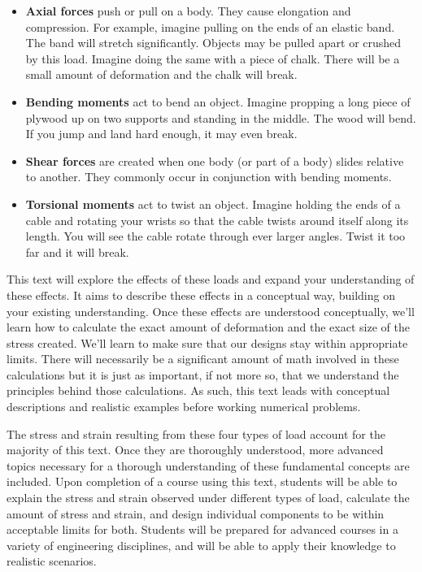 \documentclass[
  letterpaper,
  DIV=11,
  numbers=noendperiod]{scrreprt}
\begin{document}
\begin{itemize}
\item
  \textbf{Axial forces} push or pull on a body. They cause elongation
  and compression. For example, imagine pulling on the ends of an
  elastic band. The band will stretch significantly. Objects may be
  pulled apart or crushed by this load. Imagine doing the same with a
  piece of chalk. There will be a small amount of deformation and the
  chalk will break.
\item
  \textbf{Bending moments} act to bend an object. Imagine propping a
  long piece of plywood up on two supports and standing in the middle.
  The wood will bend. If you jump and land hard enough, it may even
  break.
\item
  \textbf{Shear forces} are created when one body (or part of a body)
  slides relative to another. They commonly occur in conjunction with
  bending moments.
\item
  \textbf{Torsional moments} act to twist an object. Imagine holding the
  ends of a cable and rotating your wrists so that the cable twists
  around itself along its length. You will see the cable rotate through
  ever larger angles. Twist it too far and it will break.
\end{itemize}

This text will explore the effects of these loads and expand your
understanding of these effects. It aims to describe these effects in a
conceptual way, building on your existing understanding. Once these
effects are understood conceptually, we'll learn how to calculate the
exact amount of deformation and the exact size of the stress created.
We'll learn to make sure that our designs stay within appropriate
limits. There will necessarily be a significant amount of math involved
in these calculations but it is just as important, if not more so, that
we understand the principles behind those calculations. As such, this
text leads with conceptual descriptions and realistic examples before
working numerical problems.

The stress and strain resulting from these four types of load account
for the majority of this text. Once they are thoroughly understood, more
advanced topics necessary for a thorough understanding of these
fundamental concepts are included. Upon completion of a course using
this text, students will be able to explain the stress and strain
observed under different types of load, calculate the amount of stress
and strain, and design individual components to be within acceptable
limits for both. Students will be prepared for advanced courses in a
variety of engineering disciplines, and will be able to apply their
knowledge to realistic scenarios.
\end{document}
